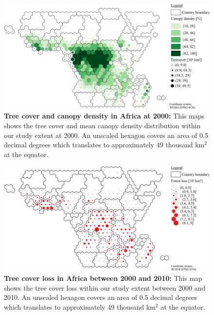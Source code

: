 			\begin{figure}[ht]
				\centering
				\includegraphics[scale=1]{img/africa_treecover_frameless}
				\caption[Tree cover and canopy density in Africa at 2000]{\textbf{Tree cover and canopy density in Africa at 2000:} This maps shows the tree cover and mean canopy density distribution within our study extent at 2000. An unscaled hexagon covers an area of 0.5 decimal degrees which translates to approximately 49 thousand km$^2$ at the equator.}
				\label{fig:africa_tree_cover}
			\end{figure}
			\begin{figure}[ht]
				\centering
				\includegraphics[scale=1]{img/africa_loss_frameless}
				\caption[Tree cover loss in Africa between 2000 and 2010]{\textbf{Tree cover loss in Africa between 2000 and 2010:} This map shows the tree cover loss within our study extent between 2000 and 2010. An unscaled hexagon covers an area of 0.5 decimal degrees which translates to approximately 49 thousand km$^2$ at the equator.}
				\label{fig:africa_loss}
			\end{figure}

